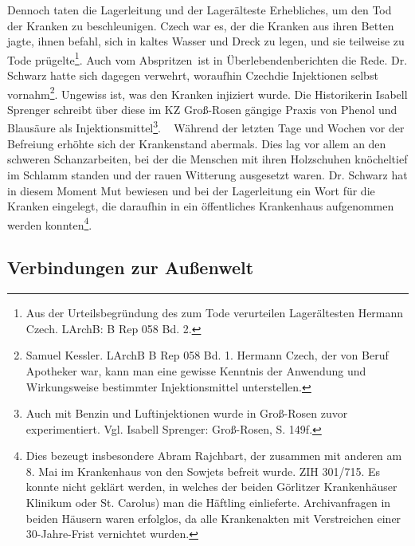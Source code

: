 \documentclass[a4paper,12pt,ngerman,
]{nisebook}
\begin{document}
Dennoch taten die Lagerleitung und der Lager\-älteste Erhebliches, um den Tod der Kranken zu beschleunigen. Czech war es, der die Kranken aus ihren Betten jagte, ihnen befahl, sich in kaltes Wasser und Dreck zu legen, und sie teilweise zu Tode prügelte\footnote{Aus der Urteilsbegründung des zum Tode verurteilen Lagerältesten Hermann Czech. LArchB: B Rep 058 Bd. 2.}. Auch vom \glqq Abspritzen\grqq~ist in Überlebendenberichten die Rede. Dr. Schwarz hatte sich dagegen verwehrt, woraufhin Czech\linebreak\newpage die Injektionen selbst vornahm\footnote{Samuel Kessler. LArchB B Rep 058 Bd. 1. Hermann Czech, der von Beruf Apotheker war, kann man eine gewisse Kenntnis der Anwendung und Wirkungsweise bestimmter Injektionsmittel unterstellen.}. Ungewiss ist, was den Kranken injiziert wurde. Die Historikerin Isabell Sprenger schreibt über diese im KZ Groß-Rosen gängige Praxis von Phenol und Blausäure als Injektionsmittel\footnote{Auch mit Benzin und Luftinjektionen wurde in Groß-Rosen zuvor experimentiert. Vgl. Isabell Sprenger: Groß-Rosen, S. 149f.}.
~\newline
\label{krankenhaus}
Während der letzten Tage und Wochen vor der Befreiung erhöhte sich der Krankenstand abermals. Dies lag vor allem an den schweren Schanzarbeiten, bei der die Menschen mit ihren Holzschuhen knöcheltief im Schlamm standen und der rauen Witterung ausgesetzt waren. Dr. Schwarz hat in diesem Moment Mut bewiesen und bei der Lagerleitung ein Wort für die Kranken eingelegt, die daraufhin in ein öffentliches Krankenhaus aufgenommen werden konnten\footnote{Dies bezeugt insbesondere Abram Rajchbart, der zusammen mit anderen am 8. Mai im Krankenhaus von den Sowjets befreit wurde. ZIH 301/715. Es konnte nicht geklärt werden, in welches der beiden Görlitzer Krankenhäuser Klinikum oder St. Carolus) man die Häftling einlieferte. Archivanfragen in beiden Häusern waren erfolglos, da alle Krankenakten mit Verstreichen einer 30-Jahre-Frist vernichtet wurden.}.

\subsection{Verbindungen zur Außenwelt}
\end{document}
